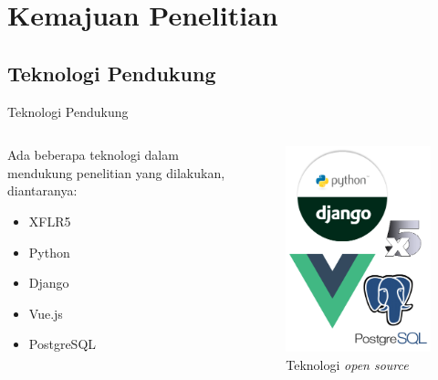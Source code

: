 \section{Kemajuan Penelitian}
\subsection{Teknologi Pendukung}

\begin{frame}{Teknologi Pendukung}
  \begin{columns}[t]
    \begin{column}{.5\linewidth}
      Ada beberapa teknologi dalam mendukung penelitian yang dilakukan, diantaranya:
      \begin{itemize}
        \item XFLR5
        \item Python
        \item Django
        \item Vue.js
        \item PostgreSQL
      \end{itemize}
    \end{column}
    \begin{column}{.5\linewidth}
      \begin{figure}[h]
        \centering
        \includegraphics[width=0.6\linewidth]{statics/stacks}
        \caption{Teknologi \textit{open source}}
        \label{fig:opentek}
      \end{figure}
    \end{column}
  \end{columns}
\end{frame}

